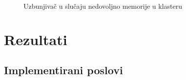 \documentclass[12pt,oneside]{memoir}
\begin{document}
\begin{figure}[!ht]
  \centering
  \caption{Uzbunjivač u slučaju nedovoljno memorije u klasteru}
  \label{fig:alertmemory}
\end{figure}


\chapter{Rezultati}
\label{chp:rezultati}

\section{Implementirani poslovi}
\end{document}
